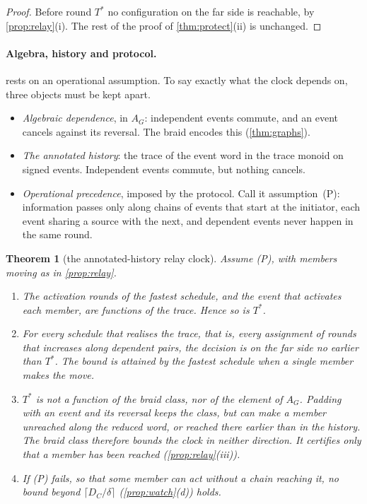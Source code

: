 \documentclass[11pt]{article}
\newtheorem{theorem}{Theorem}\newtheorem{proposition}[theorem]{Proposition}\newtheorem{lemma}[theorem]{Lemma}\newtheorem{corollary}[theorem]{Corollary}\newtheorem{conjecture}[theorem]{Conjecture}\crefname{conjecture}{Conjecture}{Conjectures}
\theoremstyle{definition}\newtheorem{definition}[theorem]{Definition}\newtheorem{remark}[theorem]{Remark}\newtheorem{example}[theorem]{Example}\newtheorem{problem}[theorem]{Open problem}\crefname{problem}{Problem}{Problems}
\begin{document}
\begin{proof}
Before round $T^\ast$ no configuration on the far side is reachable, by \cref{prop:relay}(i). The rest of the proof of \cref{thm:protect}(ii) is unchanged.
\end{proof}

\paragraph{Algebra, history and protocol.}  rests on an operational assumption. To say exactly what the clock depends on, three objects must be kept apart.
\begin{itemize}
\item \emph{Algebraic dependence}, in $A_G$: independent events commute, and an event cancels against its reversal. The braid encodes this (\cref{thm:graphs}).
\item \emph{The annotated history}: the trace of the event word in the trace monoid on signed events. Independent events commute, but nothing cancels.
\item \emph{Operational precedence}, imposed by the protocol. Call it assumption~(P): information passes only along chains of events that start at the initiator, each event sharing a source with the next, and dependent events never happen in the same round.
\end{itemize}

\begin{theorem}[the annotated-history relay clock]\label{thm:relayclock}
Assume (P), with members moving as in \cref{prop:relay}.
\begin{enumerate}
\item[(a)] The activation rounds of the fastest schedule, and the event that activates each member, are functions of the trace. Hence so is $T^\ast$.
\item[(b)] For every schedule that realises the trace, that is, every assignment of rounds that increases along dependent pairs, the decision is on the far side no earlier than $T^\ast$. The bound is attained by the fastest schedule when a single member makes the move.
\item[(c)] $T^\ast$ is not a function of the braid class, nor of the element of $A_G$. Padding with an event and its reversal keeps the class, but can make a member unreached along the reduced word, or reached there earlier than in the history. The braid class therefore bounds the clock in neither direction. It certifies only that a member has been reached (\cref{prop:relay}(iii)).
\item[(d)] If (P) fails, so that some member can act without a chain reaching it, no bound beyond $\lceil D_C/\delta\rceil$ (\cref{prop:watch}(d)) holds.
\end{enumerate}
\end{theorem}
\end{document}
